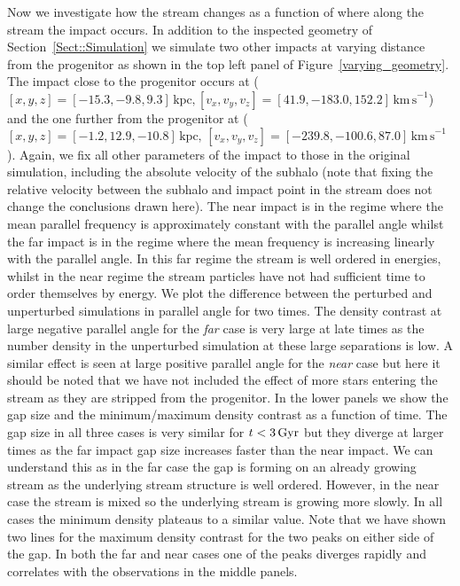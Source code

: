 \documentclass[useAMS,usenatbib,fleqn,a4paper]{mn2e}
\def\Gyr{\,{\rm Gyr}}
\begin{document}
Now we investigate how the stream changes as a function of where along the stream the impact occurs. In addition to the inspected geometry of Section~\ref{Sect::Simulation} we simulate two other impacts at varying distance from the progenitor as shown in the top left panel of Figure~\ref{varying_geometry}. The impact close to the progenitor occurs at ($[x,y,z]=[-15.3,-9.8,9.3]\,\mathrm{kpc},[v_x,v_y,v_z]=[41.9,-183.0,152.2]\,\mathrm{km\,s}^{-1}$) and the one further from the progenitor at ($[x,y,z]=[-1.2,12.9,-10.8]\,\mathrm{kpc},\,[v_x,v_y,v_z]=[-239.8,-100.6,87.0]\,\mathrm{km\,s}^{-1}$). Again, we fix all other parameters of the impact to those in the original simulation, including the absolute velocity of the subhalo (note that fixing the relative velocity between the subhalo and impact point in the stream does not change the conclusions drawn here). The near impact is in the regime where the mean parallel frequency is approximately constant with the parallel angle whilst the far impact is in the regime where the mean frequency is increasing linearly with the parallel angle. In this far regime the stream is well ordered in energies, whilst in the near regime the stream particles have not had sufficient time to order themselves by energy. We plot the difference between the perturbed and unperturbed simulations in parallel angle for two times. The density contrast at large negative parallel angle for the \emph{far} case is very large at late times as the number density in the unperturbed simulation at these large separations is low. A similar effect is seen at large positive parallel angle for the \emph{near} case but here it should be noted that we have not included the effect of more stars entering the stream as they are stripped from the progenitor. In the lower panels we show the gap size and the minimum/maximum density contrast as a function of time. The gap size in all three cases is very similar for $t<3\Gyr$ but they diverge at larger times as the far impact gap size increases faster than the near impact. We can understand this as in the far case the gap is forming on an already growing stream as the underlying stream structure is well ordered. However, in the near case the stream is mixed so the underlying stream is growing more slowly. In all cases the minimum density plateaus to a similar value. Note that we have shown two lines for the maximum density contrast for the two peaks on either side of the gap. In both the far and near cases one of the peaks diverges rapidly and correlates with the observations in the middle panels.
\end{document}
